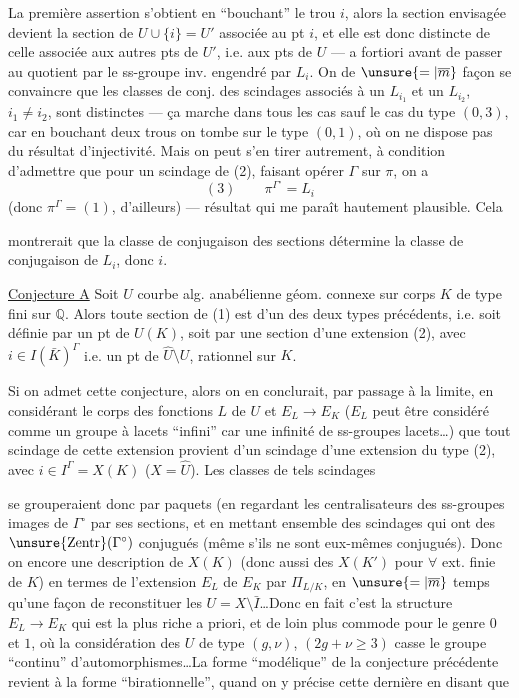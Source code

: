 La première assertion s'obtient en ``bouchant'' le trou $i$, alors la section envisagée devient la section de $U\cup\{i\}=U'$ associée au pt $i$, et elle est donc distincte de celle associée aux  autres pts de $U'$, i.e. aux pts de $U$ --- a fortiori avant de passer au quotient par le ss-groupe inv. engendré par $L_i$. On  de $\unsure{=|\overline m}$ façon se convaincre que les classes de conj. des scindages associés à un $L_{i_1}$ et un $L_{i_2}$, $i_1\ne i_2$, sont distinctes --- ça marche dans tous les cas sauf le cas du type $(0,3)$,  car en bouchant deux trous on tombe sur le type $(0,1)$, où on ne dispose pas du résultat d'injectivité. Mais on peut s'en tirer autrement, à condition d'admettre que pour un scindage de (2), faisant opérer $\Gamma$ sur $\pi$, on a
\[
(3)\qquad\pi^{\Gamma^\circ}=L_i
\]
(donc $\pi^\Gamma=(1)$, d'ailleurs) --- résultat qui me paraît hautement plausible. Cela

montrerait que la classe de conjugaison des sections détermine la classe de conjugaison de $L_i$, donc $i$.

\uline{Conjecture A} Soit $U$ courbe alg. anabélienne géom. connexe sur corps $K$ de type fini sur $\mathbb{Q}$. Alors toute section de (1) est  d'un des deux types précédents, i.e. soit définie par un pt de $U(K)$, soit par une section d'une extension (2), avec $i\in I(\bar K)^\Gamma$ i.e. un pt de $\widehat U\setminus U$, rationnel sur $K$.

Si on admet cette conjecture, alors on en conclurait, par passage à la limite, en considérant le corps des fonctions $L$ de $U$ et $E_L\longrightarrow E_K$ ($E_L$ peut être considéré comme un groupe à lacets ``infini'' car une infinité de  ss-groupes lacets\ldots) que tout scindage de cette extension provient d'un scindage d'une extension du type (2), avec $i\in I^\Gamma=X(K)$ ($X=\widehat U$). Les classes de tels scindages

se grouperaient donc  par paquets (en regardant les centralisateurs des ss-groupes images de $\Gamma^\circ$ par ses sections,\deleted{)} et en mettant ensemble des scindages qui ont des $\unsure{\mathrm{Zentr}}(\Gamma^\circ)$ conjugués (même s'ils ne sont eux-mêmes conjugués). Donc on  encore une description de $X(K)$ (donc aussi des $X(K')$ pour $\forall$ ext. finie  de $K$) en termes de l'extension $E_L$ de $E_K$ par $\Pi_{L/K}$, en $\unsure{=|\overline m}$ temps qu'une façon de reconstituer les $U=X\setminus\bar I$\ldots Donc en fait c'est la structure $E_L\longrightarrow E_K$ qui est la plus riche a priori, et de loin plus commode pour le genre $0$ et $1$, où la considération des $U$ de type $(g,\nu)$, $(2g+\nu\geq3)$ casse le groupe ``continu'' d'automorphismes\ldots La forme ``modélique'' de la conjecture précédente revient à la forme ``birationnelle'', quand on y précise cette dernière en disant que 

